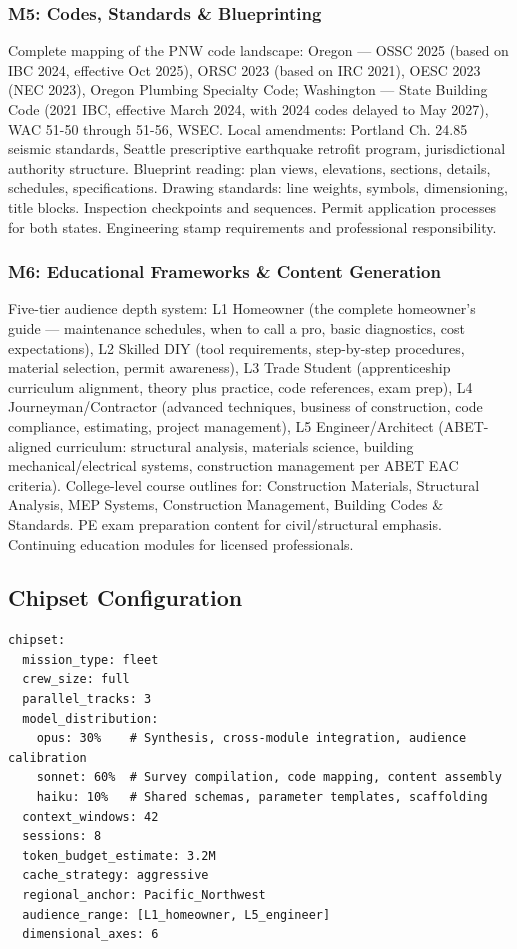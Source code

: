 \documentclass[11pt,letterpaper]{article}
\begin{document}
\subsubsection{M5: Codes, Standards \& Blueprinting}

Complete mapping of the PNW code landscape: Oregon --- OSSC 2025 (based on IBC 2024, effective Oct 2025), ORSC 2023 (based on IRC 2021), OESC 2023 (NEC 2023), Oregon Plumbing Specialty Code; Washington --- State Building Code (2021 IBC, effective March 2024, with 2024 codes delayed to May 2027), WAC 51-50 through 51-56, WSEC. Local amendments: Portland Ch. 24.85 seismic standards, Seattle prescriptive earthquake retrofit program, jurisdictional authority structure. Blueprint reading: plan views, elevations, sections, details, schedules, specifications. Drawing standards: line weights, symbols, dimensioning, title blocks. Inspection checkpoints and sequences. Permit application processes for both states. Engineering stamp requirements and professional responsibility.

\subsubsection{M6: Educational Frameworks \& Content Generation}

Five-tier audience depth system: L1 Homeowner (the complete homeowner's guide --- maintenance schedules, when to call a pro, basic diagnostics, cost expectations), L2 Skilled DIY (tool requirements, step-by-step procedures, material selection, permit awareness), L3 Trade Student (apprenticeship curriculum alignment, theory plus practice, code references, exam prep), L4 Journeyman/Contractor (advanced techniques, business of construction, code compliance, estimating, project management), L5 Engineer/Architect (ABET-aligned curriculum: structural analysis, materials science, building mechanical/electrical systems, construction management per ABET EAC criteria). College-level course outlines for: Construction Materials, Structural Analysis, MEP Systems, Construction Management, Building Codes \& Standards. PE exam preparation content for civil/structural emphasis. Continuing education modules for licensed professionals.

\subsection{Chipset Configuration}

\begin{asciibox}
\begin{verbatim}
chipset:
  mission_type: fleet
  crew_size: full
  parallel_tracks: 3
  model_distribution:
    opus: 30%    # Synthesis, cross-module integration, audience calibration
    sonnet: 60%  # Survey compilation, code mapping, content assembly
    haiku: 10%   # Shared schemas, parameter templates, scaffolding
  context_windows: 42
  sessions: 8
  token_budget_estimate: 3.2M
  cache_strategy: aggressive
  regional_anchor: Pacific_Northwest
  audience_range: [L1_homeowner, L5_engineer]
  dimensional_axes: 6
\end{verbatim}
\end{asciibox}
\end{document}
